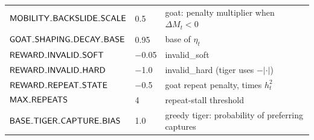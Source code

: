 {\begin{longtable}{@{}lll@{}}
$\knob{MOBILITY\_BACKSLIDE\_SCALE}$ & 0.5 & goat: penalty multiplier when $\Delta M_t < 0$ \\
$\knob{GOAT\_SHAPING\_DECAY\_BASE}$ & 0.95 & base of $\eta_t$ \\
$\knob{REWARD\_INVALID\_SOFT}$ & −0.05 & invalid\_soft \\
$\knob{REWARD\_INVALID\_HARD}$ & −1.0 & invalid\_hard (tiger uses $-\lvert\cdot\rvert$) \\
$\knob{REWARD\_REPEAT\_STATE}$ & −0.5 & goat repeat penalty, times $h_t^2$ \\
$\knob{MAX\_REPEATS}$ & 4 & repeat-stall threshold \\
$\knob{BASE\_TIGER\_CAPTURE\_BIAS}$ & 1.0 & greedy tiger: probability of preferring captures \\
\bottomrule
\end{longtable}\addtocounter{table}{-1}
}

